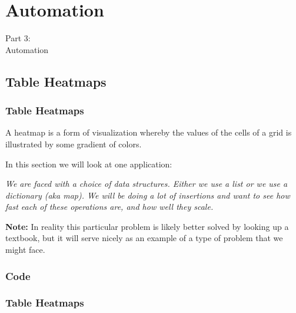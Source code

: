 
{
\renewcommand{\bgcolor}{auto}

\section{Automation}
\begin{frame}
  \vspace{25mm}
  \begin{center}
    \Huge{Part 3:\\Automation}
  \end{center}
\end{frame}

\subsection{Table Heatmaps}
\begin{frame}[fragile]
  \frametitle{Table Heatmaps}
  \vspace{3mm}
  A heatmap is a form of visualization whereby the values of the cells of a grid is illustrated by some gradient of colors.
  
  \vspace{5mm}
  In this section we will look at one application:
  
  \begin{center}
    \textsl{We are faced with a choice of data structures. Either we use a list or we use a dictionary (aka map). We will be doing a lot of insertions and want to see how fast each of these operations are, and how well they scale.}
  \end{center}
  
  \vspace{5mm}
  \textbf{Note:} In reality this particular problem is likely better solved by looking up a textbook, but it will serve nicely as an example of a type of problem that we might face.
\end{frame}

\subsubsection{Code}
\begin{frame}[fragile]
  \frametitle{Table Heatmaps }
  \vspace{0mm}
  \inputminted[fontsize=\tiny]{python}{../src/table_heatmap/code.py}
\end{frame}

}
